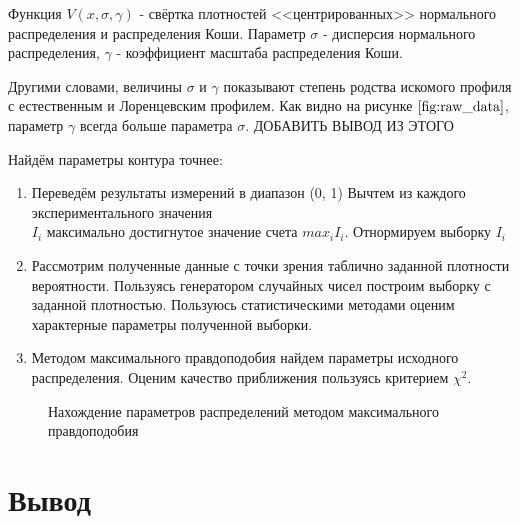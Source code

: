 \documentclass[a4paper, 14pt]{article}
\begin{document}
Функция $V(x, \sigma, \gamma)$ - свёртка плотностей <<центрированных>> нормального распределения и распределения Коши.
Параметр $\sigma$ - дисперсия нормального распределения, $\gamma$ - коэффициент масштаба распределения Коши.

Другими словами, величины $\sigma$ и $\gamma$ показывают степень родства искомого профиля с естественным и Лоренцевским профилем.
Как видно на рисунке $\ref{fig:raw_data}$, параметр $\gamma$ всегда больше параметра $\sigma$. ДОБАВИТЬ ВЫВОД ИЗ ЭТОГО


Найдём параметры контура точнее:
\begin{enumerate}
    \item Переведём результаты измерений в диапазон (0, 1)
          \subitem Вычтем из каждого экспериментального значения \\

           $I_{i}$ максимально достигнутое значение счета $max_{i} I_{i}$.
          \subitem Отнормируем выборку $I_{i}$
    \item Рассмотрим полученные данные с точки зрения таблично заданной плотности вероятности. Пользуясь генератором случайных чисел построим выборку с заданной плотностью. Пользуюсь статистическими методами
          оценим характерные параметры полученной выборки.
    \item Методом максимального правдоподобия найдем параметры исходного распределения. Оценим качество приближения
          пользуясь критерием $\chi^{2}$.
\end{enumerate}
\begin{figure}[h]
    
    \caption{Нахождение параметров распределений методом максимального правдоподобия}
\end{figure}


\section*{\textcolor{header}{Вывод}}
\end{document}
